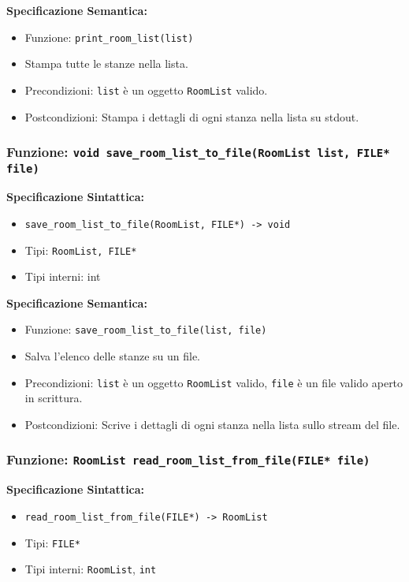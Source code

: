 \documentclass[11pt]{scrartcl} %
\begin{document}
\textbf{Specificazione Semantica:}
\begin{itemize}
\item Funzione: \texttt{print\_room\_list(list)}
\item Stampa tutte le stanze nella lista.
\item Precondizioni: \texttt{list} è un oggetto \texttt{RoomList} valido.
\item Postcondizioni: Stampa i dettagli di ogni stanza nella lista su stdout.
\end{itemize}

\subsubsection{Funzione: \texttt{void save\_room\_list\_to\_file(RoomList list, FILE* file)}}

\textbf{Specificazione Sintattica:}
\begin{itemize}
\item \texttt{save\_room\_list\_to\_file(RoomList, FILE*) -> void}
\item Tipi: \texttt{RoomList, FILE*}
\item Tipi interni: int
\end{itemize}

\textbf{Specificazione Semantica:}
\begin{itemize}
\item Funzione: \texttt{save\_room\_list\_to\_file(list, file)}
\item Salva l'elenco delle stanze su un file.
\item Precondizioni: \texttt{list} è un oggetto \texttt{RoomList} valido, \texttt{file} è un file valido aperto in scrittura.
\item Postcondizioni: Scrive i dettagli di ogni stanza nella lista sullo stream del file.
\end{itemize}

\subsubsection{Funzione: \texttt{RoomList read\_room\_list\_from\_file(FILE* file)}}

\textbf{Specificazione Sintattica:}
\begin{itemize}
\item \texttt{read\_room\_list\_from\_file(FILE*) -> RoomList}
\item Tipi: \texttt{FILE*}
\item Tipi interni: \texttt{RoomList}, \texttt{int}
\end{itemize}
\end{document}
